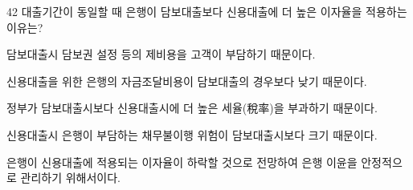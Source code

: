\begin{question}{42}
대출기간이 동일할 때 은행이 담보대출보다 신용대출에 더 높은 이자율을 적용하는 이유는?
\begin{choices}
  \item 담보대출시 담보권 설정 등의 제비용을 고객이 부담하기 때문이다.
  \item 신용대출을 위한 은행의 자금조달비용이 담보대출의 경우보다 낮기 때문이다.
  \item 정부가 담보대출시보다 신용대출시에 더 높은 세율(稅率)을 부과하기 때문이다.
  \item 신용대출시 은행이 부담하는 채무불이행 위험이 담보대출시보다 크기 때문이다.
  \item 은행이 신용대출에 적용되는 이자율이 하락할 것으로 전망하여 은행 이윤을 안정적으로 관리하기 위해서이다.
\end{choices}
\end{question}

